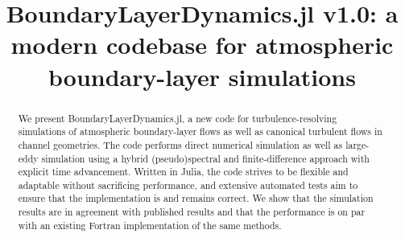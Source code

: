 \documentclass[gmd, manuscript]{copernicus}
\begin{document}
\title{BoundaryLayerDynamics.jl v1.0: a modern codebase for atmospheric boundary-layer simulations}

















\received{}
\pubdiscuss{} %
\revised{}
\accepted{}
\published{}




\maketitle



\begin{abstract}
\noindent
We present BoundaryLayerDynamics.jl, a new code for turbulence-resolving simulations of atmospheric boundary-layer flows as well as canonical turbulent flows in channel geometries.
The code performs direct numerical simulation as well as large-eddy simulation using a hybrid (pseudo)spectral and finite-difference approach with explicit time advancement.
Written in Julia, the code strives to be flexible and adaptable without sacrificing performance, and extensive automated tests aim to ensure that the implementation is and remains correct.
We show that the simulation results are in agreement with published results and that the performance is on par with an existing Fortran implementation of the same methods.
\end{abstract}
\end{document}
